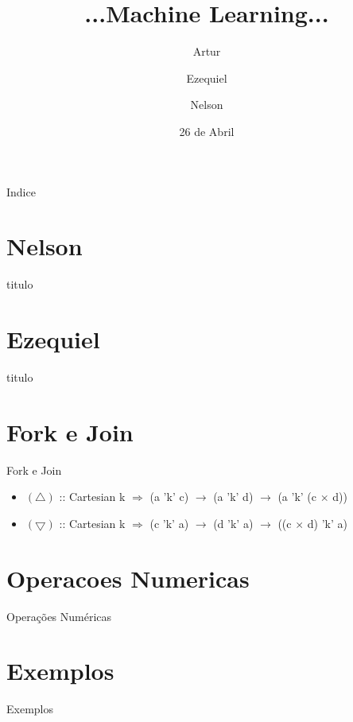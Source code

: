 \documentclass{beamer}
\title
{...Machine Learning...}
\author[Artur, Ezequiel, Nelson] 
{Artur \and Ezequiel \and Nelson}
\institute
{Universidade do Minho}
\date
{26 de Abril}
\begin{document}
\begin{frame}
  \titlepage
\end{frame}

\begin{frame}{Indice}
  \tableofcontents
\end{frame}


\section{Nelson}

\begin{frame}{titulo}
\end{frame}


\section{Ezequiel}

\begin{frame}{titulo}
\end{frame}

\section{Fork e Join}
\begin{frame}{Fork e Join}
    \begin{itemize}
        \item
            $(\triangle)$ :: Cartesian k $\Rightarrow$ (a 'k' c) $\to$ (a 'k' d) $\to$ (a 'k' (c $\times$ d))
        \item
            $(\bigtriangledown)$ :: Cartesian k $\Rightarrow$ (c 'k' a) $\to$ (d 'k' a) $\to$ ((c $\times$ d) 'k' a)
    \end{itemize}
\end{frame}

\section{Operacoes Numericas}
\begin{frame}{Operações Numéricas}
\end{frame}

\section{Exemplos}
\begin{frame}{Exemplos}
\end{frame}
\end{document}
